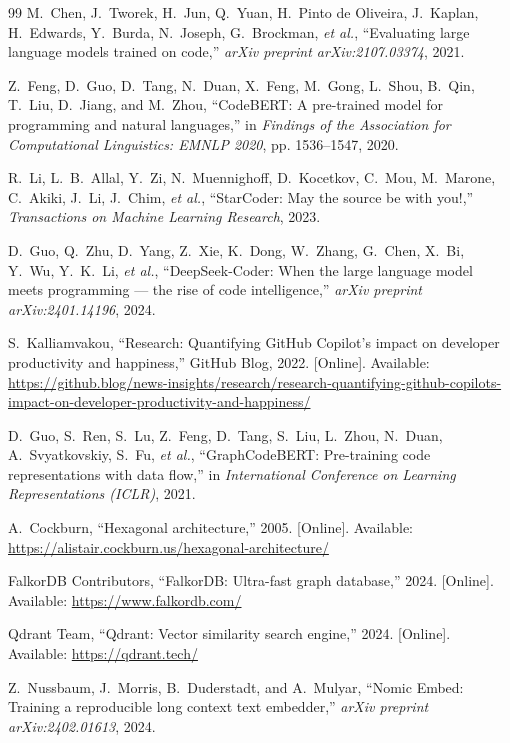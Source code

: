 \documentclass[12pt,letterpaper,oneside]{report}
\begin{document}
\begin{singlespace}
\begin{thebibliography}{99}
M.~Chen, J.~Tworek, H.~Jun, Q.~Yuan, H.~Pinto de Oliveira, J.~Kaplan, H.~Edwards, Y.~Burda, N.~Joseph, G.~Brockman, \textit{et al.}, ``Evaluating large language models trained on code,'' \textit{arXiv preprint arXiv:2107.03374}, 2021.

Z.~Feng, D.~Guo, D.~Tang, N.~Duan, X.~Feng, M.~Gong, L.~Shou, B.~Qin, T.~Liu, D.~Jiang, and M.~Zhou, ``CodeBERT: A pre-trained model for programming and natural languages,'' in \textit{Findings of the Association for Computational Linguistics: EMNLP 2020}, pp. 1536--1547, 2020.

R.~Li, L.~B.~Allal, Y.~Zi, N.~Muennighoff, D.~Kocetkov, C.~Mou, M.~Marone, C.~Akiki, J.~Li, J.~Chim, \textit{et al.}, ``StarCoder: May the source be with you!,'' \textit{Transactions on Machine Learning Research}, 2023.

D.~Guo, Q.~Zhu, D.~Yang, Z.~Xie, K.~Dong, W.~Zhang, G.~Chen, X.~Bi, Y.~Wu, Y.~K.~Li, \textit{et al.}, ``DeepSeek-Coder: When the large language model meets programming --- the rise of code intelligence,'' \textit{arXiv preprint arXiv:2401.14196}, 2024.

S.~Kalliamvakou, ``Research: Quantifying GitHub Copilot's impact on developer productivity and happiness,'' GitHub Blog, 2022. [Online]. Available: \url{https://github.blog/news-insights/research/research-quantifying-github-copilots-impact-on-developer-productivity-and-happiness/}

D.~Guo, S.~Ren, S.~Lu, Z.~Feng, D.~Tang, S.~Liu, L.~Zhou, N.~Duan, A.~Svyatkovskiy, S.~Fu, \textit{et al.}, ``GraphCodeBERT: Pre-training code representations with data flow,'' in \textit{International Conference on Learning Representations (ICLR)}, 2021.

A.~Cockburn, ``Hexagonal architecture,'' 2005. [Online]. Available: \url{https://alistair.cockburn.us/hexagonal-architecture/}

FalkorDB Contributors, ``FalkorDB: Ultra-fast graph database,'' 2024. [Online]. Available: \url{https://www.falkordb.com/}

Qdrant Team, ``Qdrant: Vector similarity search engine,'' 2024. [Online]. Available: \url{https://qdrant.tech/}

Z.~Nussbaum, J.~Morris, B.~Duderstadt, and A.~Mulyar, ``Nomic Embed: Training a reproducible long context text embedder,'' \textit{arXiv preprint arXiv:2402.01613}, 2024.


\end{thebibliography}
\end{singlespace}
\end{document}
